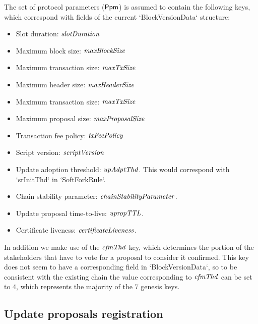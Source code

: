 The set of protocol parameters ($\mathsf{Ppm}$) is assumed to contain the following keys, which
correspond with fields of the current `BlockVersionData` structure:
\begin{itemize}
\item Slot duration: $\mathit{slotDuration}$
\item Maximum block size: $\mathit{maxBlockSize}$
\item Maximum transaction size: $\mathit{maxTxSize}$
\item Maximum header size: $\mathit{maxHeaderSize}$
\item Maximum transaction size: $\mathit{maxTxSize}$
\item Maximum proposal size: $\mathit{maxProposalSize}$
\item Transaction fee policy: $\mathit{txFeePolicy}$
\item Script version: $\mathit{scriptVersion}$
\item Update adoption threshold: $\mathit{upAdptThd}$. This would correspond with
  `srInitThd` in `SoftForkRule`.
\item Chain stability parameter: $\mathit{chainStabilityParameter}$.
\item Update proposal time-to-live: $\mathit{upropTTL}$.
\item Certificate liveness: $\mathit{certificateLiveness}$.
\end{itemize}
In addition we make use of the $\mathit{cfmThd}$ key, which determines the portion
of the stakeholders that have to vote for a proposal to consider it confirmed.
This key does not seem to have a corresponding field in `BlockVersionData`, so
to be consistent with the existing chain the value corresponding to
$\mathit{cfmThd}$ can be set to $4$, which represents the majority of the $7$
genesis keys.

\subsection{Update proposals registration}
\label{sec:update-proposals-registration}

